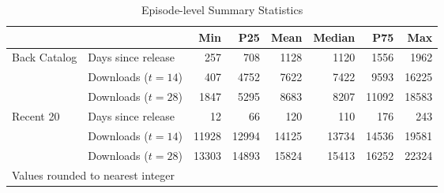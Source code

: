 \begin{table}

\caption{Episode-level Summary Statistics \label{tab:ep-summ-stats}}
\centering
\begin{tabular}[t]{llrrrrrr}
\toprule
  &    & Min & P25 & Mean & Median & P75 & Max\\
\midrule
Back Catalog & Days since release & \num{257} & \num{708} & \num{1128} & \num{1120} & \num{1556} & \num{1962}\\
 & Downloads ($t=14$) & \num{407} & \num{4752} & \num{7622} & \num{7422} & \num{9593} & \num{16225}\\
 & Downloads ($t=28$) & \num{1847} & \num{5295} & \num{8683} & \num{8207} & \num{11092} & \num{18583}\\
Recent 20 & Days since release & \num{12} & \num{66} & \num{120} & \num{110} & \num{176} & \num{243}\\
 & Downloads ($t=14$) & \num{11928} & \num{12994} & \num{14125} & \num{13734} & \num{14536} & \num{19581}\\
 & Downloads ($t=28$) & \num{13303} & \num{14893} & \num{15824} & \num{15413} & \num{16252} & \num{22324}\\
\bottomrule
\multicolumn{8}{l}{\rule{0pt}{1em}Values rounded to nearest integer}\\
\end{tabular}
\end{table}
